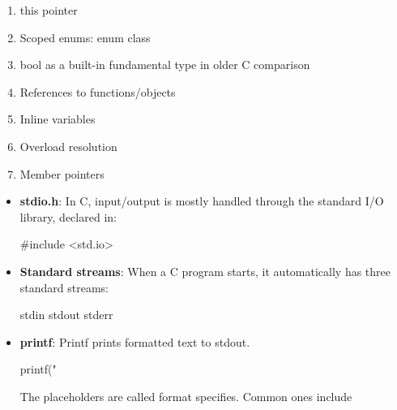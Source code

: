 \documentclass{report}
\begin{document}
\begin{itemize}
\begin{enumerate}
                \item this pointer
                \item Scoped enums: enum class
                \item bool as a built-in fundamental type in older C comparison
                \item References to functions/objects
                \item Inline variables
                \item Overload resolution
                \item Member pointers
            \end{enumerate}
    \end{itemize}

    \pagebreak 
    \begin{itemize}
        \item \textbf{stdio.h}: In C, input/output is mostly handled through the standard I/O library, declared in:
            \bigbreak \noindent 
            \begin{cppcode}
            #include <std.io>
            \end{cppcode}
        \item \textbf{Standard streams}: When a C program starts, it automatically has three standard streams:
            \bigbreak \noindent 
            \begin{cppcode}
            stdin
            stdout
            stderr
            \end{cppcode}
        \item \textbf{printf}: Printf prints formatted text to stdout.
            \bigbreak \noindent 
            \begin{cppcode}
            printf("%
            \end{cppcode}
            \bigbreak \noindent 
            The placeholders are called format specifies. Common ones include
            \bigbreak \noindent 
            \begin{cppcode}


\end{cppcode}
\end{itemize}
\end{document}
